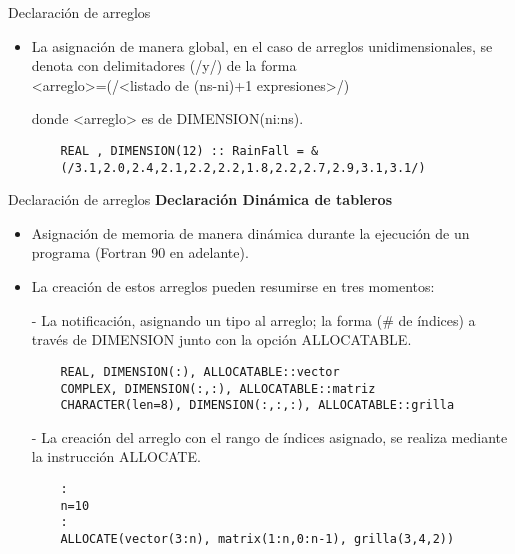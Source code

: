 \begin{frame}[fragile]{Declaración de arreglos}
 \begin{itemize}[<+(0)->]
  \item La asignación de manera global, en el caso de arreglos unidimensionales, se denota con delimitadores (/y/) de la forma \\ 
  \centering <arreglo>=(/<listado de (ns-ni)+1 expresiones>/) \\ 
  \item [] donde <arreglo> es de DIMENSION(ni:ns).
  \vspace{0.2cm}
  \item []
  \begin{verbatim}
    REAL , DIMENSION(12) :: RainFall = &
    (/3.1,2.0,2.4,2.1,2.2,2.2,1.8,2.2,2.7,2.9,3.1,3.1/)
  \end{verbatim}
 \end{itemize}
\end{frame} 


\begin{frame}[fragile]{Declaración de arreglos}
\textbf{Declaración Dinámica de tableros}
 \begin{itemize}[<+(1)->]
  \item Asignación de memoria de manera dinámica durante la ejecución de un programa (Fortran 90 en adelante).
  \item La creación de estos arreglos pueden resumirse en tres momentos: 
  \item [-] La notificación, asignando un tipo al arreglo; la forma (\# de índices) a través de DIMENSION junto con la opción ALLOCATABLE.
  \vspace{0.2cm}
  \item []
    \begin{verbatim}
    REAL, DIMENSION(:), ALLOCATABLE::vector
    COMPLEX, DIMENSION(:,:), ALLOCATABLE::matriz
    CHARACTER(len=8), DIMENSION(:,:,:), ALLOCATABLE::grilla
    \end{verbatim}
  \item [-] La creación del arreglo con el rango de índices asignado, se realiza mediante la instrucción ALLOCATE.
  \vspace{0.2cm}
  \item [] 
    \begin{verbatim}
    :
    n=10
    :
    ALLOCATE(vector(3:n), matrix(1:n,0:n-1), grilla(3,4,2))
    \end{verbatim}
 \end{itemize}
\end{frame}


